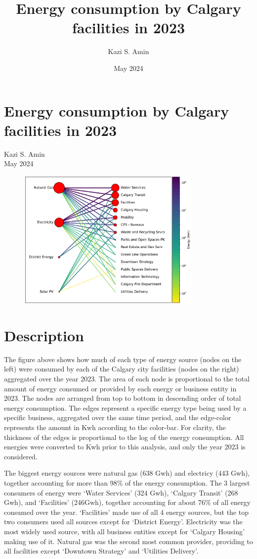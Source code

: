 \documentclass{article}
\title{Energy consumption by Calgary facilities in 2023}
\author{Kazi S. Amin}
\date{May 2024}
\begin{document}
{\centering\section*{Energy consumption by Calgary facilities in 2023}
Kazi S. Amin\\
May 2024\\
}
\begin{figure}
    \centering
    \includegraphics[width=0.8\textwidth]{Data_Analytics_Summer_Position/graph.pdf}
    \label{fig:enter-label}
\end{figure}

\FloatBarrier
\section*{Description}

The figure above shows how much of each type of energy source (nodes on the left) were consumed by each of the Calgary city facilities (nodes on the right) aggregated over the year 2023. The area of each node is proportional to the total amount of energy consumed or provided by each energy or business entity in 2023. The nodes are arranged from top to bottom in descending order of total energy consumption. The edges represent a specific energy type being used by a specific business, aggregated over the same time period, and the edge-color represents the amount in Kwh according to the color-bar. For clarity, the thickness of the edges is proportional to the log of the energy consumption. All energies were converted to Kwh prior to this analysis, and only the year 2023 is considered.

The biggest energy sources were natural gas (638 Gwh) and electricy (443 Gwh), together accounting for more than 98\% of the energy consumption. The 3 largest consumers of energy were `Water Services' (324 Gwh), `Calgary Transit' (268 Gwh), and `Facilities' (246Gwh), together accounting for about 76\% of all energy consumed over the year. `Facilities' made use of all 4 energy sources, but the top two consumers used all sources except for `District Energy'. Electricity was the most widely used source, with all business entities except for `Calgary Housing' making use of it. Natural gas was the second most common provider, providing to all facilities except `Downtown Strategy' and `Utilities Delivery'.
\end{document}
